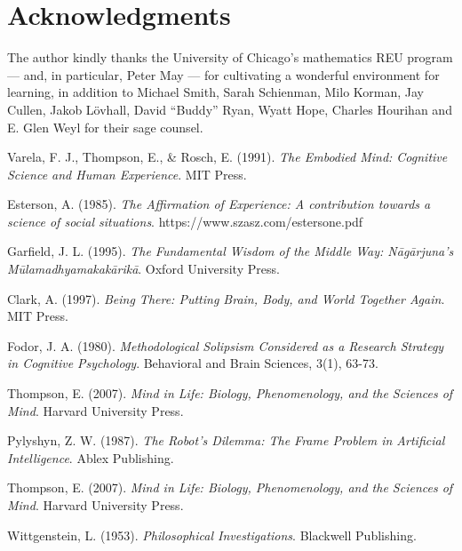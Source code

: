 \documentclass{article}
\begin{document}
\section*{Acknowledgments}

The author kindly thanks the University of Chicago's mathematics REU program --- and, in particular, Peter May --- for cultivating a wonderful environment for learning, in addition to Michael Smith, Sarah Schienman, Milo Korman, Jay Cullen, Jakob Lövhall, David ``Buddy'' Ryan, Wyatt Hope, Charles Hourihan and E. Glen Weyl for their sage counsel.

\begin{thebibliography}{9}

    Varela, F. J., Thompson, E., \& Rosch, E. (1991). \textit{The Embodied Mind: Cognitive Science and Human Experience}. MIT Press.

    Esterson, A. (1985). \textit{The Affirmation of Experience: A contribution towards a science of social situations}. https://www.szasz.com/estersone.pdf

    Garfield, J. L. (1995). \textit{The Fundamental Wisdom of the Middle Way: Nāgārjuna's Mūlamadhyamakakārikā}. Oxford University Press.

     Clark, A. (1997). \textit{Being There: Putting Brain, Body, and World Together Again}. MIT Press.

     Fodor, J. A. (1980). \textit{Methodological Solipsism Considered as a Research Strategy in Cognitive Psychology}. Behavioral and Brain Sciences, 3(1), 63-73.

     Thompson, E. (2007). \textit{Mind in Life: Biology, Phenomenology, and the Sciences of Mind}. Harvard University Press.

     Pylyshyn, Z. W. (1987). \textit{The Robot's Dilemma: The Frame Problem in Artificial Intelligence}. Ablex Publishing.

     Thompson, E. (2007). \textit{Mind in Life: Biology, Phenomenology, and the Sciences of Mind}. Harvard University Press.

     Wittgenstein, L. (1953). \textit{Philosophical Investigations}. Blackwell Publishing.


\end{thebibliography}
\end{document}
